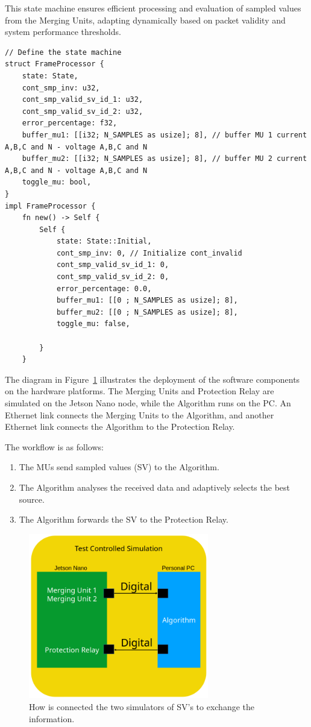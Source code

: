 This state machine ensures efficient processing and evaluation of sampled values from the Merging Units, adapting dynamically based on packet validity and system performance thresholds.

\begin{lstlisting}[caption={State Machine struct.}]
// Define the state machine
struct FrameProcessor {
	state: State,
	cont_smp_inv: u32,
	cont_smp_valid_sv_id_1: u32,
	cont_smp_valid_sv_id_2: u32,
	error_percentage: f32,
	buffer_mu1: [[i32; N_SAMPLES as usize]; 8], // buffer MU 1 current A,B,C and N - voltage A,B,C and N
	buffer_mu2: [[i32; N_SAMPLES as usize]; 8], // buffer MU 2 current A,B,C and N - voltage A,B,C and N
	toggle_mu: bool,
}
impl FrameProcessor {
	fn new() -> Self {
		Self {
			state: State::Initial,
			cont_smp_inv: 0, // Initialize cont_invalid
			cont_smp_valid_sv_id_1: 0,
			cont_smp_valid_sv_id_2: 0,
			error_percentage: 0.0,
			buffer_mu1: [[0 ; N_SAMPLES as usize]; 8],
			buffer_mu2: [[0 ; N_SAMPLES as usize]; 8],
			toggle_mu: false,
			
		}
	}
\end{lstlisting}

The diagram in Figure~\ref{fig:test_setup} illustrates the deployment of the software components on the hardware platforms.
The Merging Units and Protection Relay are simulated on the Jetson Nano node, while the Algorithm runs on the PC.
An Ethernet link connects the Merging Units to the Algorithm, and another Ethernet link connects the Algorithm to the Protection Relay.

The workflow is as follows:
\begin{enumerate}
	\item The MUs send sampled values (SV) to the Algorithm.
	\item The Algorithm analyses the received data and adaptively selects the best source.
	\item The Algorithm forwards the SV to the Protection Relay.
\end{enumerate}


\begin{figure}[tbh!]
	\centering
	\includegraphics[width=0.70\textwidth, keepaspectratio]{ch4/assets/test_setup.png}
	\caption{How is connected the two simulators of SV's to exchange the information.}
	\label{fig:test_setup}
\end{figure}

